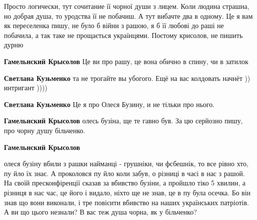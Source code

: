 \begin{itemize}
\begin{itemize}
Просто логически, тут сочитание її чорної души з лицем. Коли людина страшна, но
добрая душа, то уродства її не побачиш. А тут вибачте два в одному. Це я вам як
переселенка пишу, не було б війни з рашою, я б її любові до раші не побачила, а
так таке не прощається українцями. Поєтому крисолов, не пишить дурню


 
\textbf{Гамельнский Крысолов} Це ви про рашу, це вона обично в спину, чи в затилок

 
\textbf{Светлана Кузьменко} та не трогайте вы убогого. Ещё на вас колдовать начнёт )) интригант ))))

 
\textbf{Светлана Кузьменко} Це я про Олеся Бузину, и не тільки про нього.

 
\textbf{Гамельнский Крысолов} олесь бузіна, ще те гавно був. За цю серйозно пишу, про чорну душу більченко.

 
\textbf{Гамельнский Крысолов} 

олеся бузіну вбили з рашки найманці - грушніки, чи фсбешнік, то все рівно хто,
пу йло їх знає. А проколовся пу йло коли забув, о різниці в часі в нас з рашой.
На своїй пресконфіренції сказав за вбивство бузіни, а пройшло тіко 5 хвилин, а
різниця в нас час, це його і видало, ніхто ще не знав, це в пу була осечка. Бо
він знав що вони виконали, і тре повісити вбивство на наших українських
патріотів. А ви що цього незнали? В вас теж душа чорна, як у більченко?



\end{itemize}
\end{itemize}

